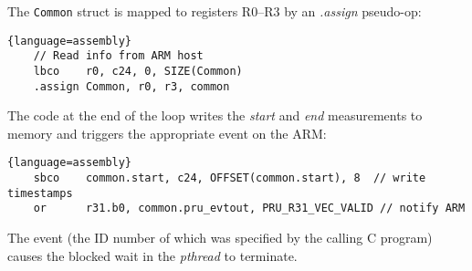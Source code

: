 \documentclass[letterpaper,11pt,fleqn]{article}
\begin{document}
The \texttt{Common} struct is mapped to registers R0--R3 by an \textit{.assign}
pseudo-op:

\begin{lstlisting}{language=assembly}
    // Read info from ARM host
    lbco    r0, c24, 0, SIZE(Common)
    .assign Common, r0, r3, common
\end{lstlisting}

The code at the end of the loop writes the \textit{start} and \textit{end}
measurements to memory and triggers the appropriate event on the ARM:

\begin{lstlisting}{language=assembly}
    sbco    common.start, c24, OFFSET(common.start), 8  // write timestamps
    or      r31.b0, common.pru_evtout, PRU_R31_VEC_VALID // notify ARM
\end{lstlisting}

The event (the ID number of which was specified by the calling C program)
causes the blocked wait in the \textit{pthread} to terminate.
\end{document}
